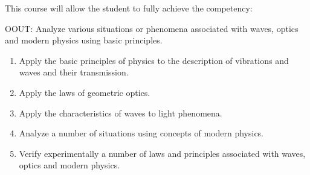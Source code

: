 {This course will allow the student to fully achieve the competency:

OOUT:  Analyze various situations or phenomena associated with waves, optics and modern physics using basic principles.
\begin{enumerate}
\item Apply the basic principles of physics to the description of vibrations and waves and their transmission.
\item Apply the laws of geometric optics.
\item Apply the characteristics of waves to light phenomena.
\item Analyze a number of situations using concepts of modern physics.
\item Verify experimentally a number of laws and principles associated with waves, optics and modern physics.
\end{enumerate}

}
